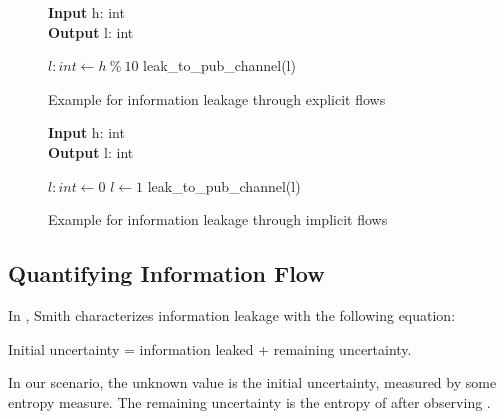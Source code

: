 \begin{figure}
    \centering
    \begin{minipage}{.7\linewidth}
        \begin{algorithm}[H]
            \hspace*{\algorithmicindent} \textbf{Input} h: int \\
            \hspace*{\algorithmicindent} \textbf{Output} l: int
            \hspace*{1em}
            \begin{algorithmic}[1]
                \State $l: int \leftarrow h \: \% \: 10$
                \State leak_to_pub_channel(l)
            \end{algorithmic} 
        \end{algorithm}
\end{minipage}
\caption{Example for information leakage through explicit flows}
\label{fig:exEx}
\end{figure}

\begin{figure}
    \centering
    \begin{minipage}{.7\linewidth}
        \begin{algorithm}[H]
            \hspace*{\algorithmicindent} \textbf{Input} h: int \\
            \hspace*{\algorithmicindent} \textbf{Output} l: int
            \hspace*{1em}
            \begin{algorithmic}[1]
                \State $l: int \leftarrow 0$
                \State $l \leftarrow 1$
                \EndIf
                \State leak_to_pub_channel(l)
            \end{algorithmic} 
        \end{algorithm}
\end{minipage}
\caption{Example for information leakage through implicit flows}
\label{fig:ifEx}
\end{figure}

\subsection{Quantifying Information Flow}

In \cite{smith09}, Smith characterizes information leakage with the following equation:
\begin{center}
    Initial uncertainty = information leaked + remaining uncertainty.
\end{center}
In our scenario, the unknown value \In is the initial uncertainty, measured by some entropy measure. The remaining uncertainty is the entropy of \In after observing \Out. 

